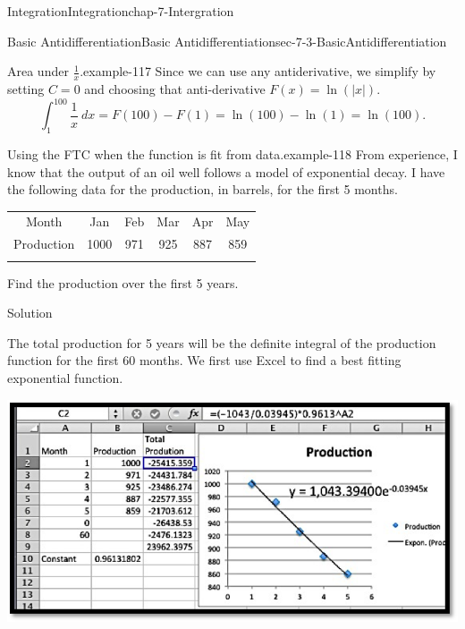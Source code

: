 \documentclass[oneside,10pt,]{book}
\numberwithin{equation}{section}
\newcommand{\hrulethin}  {\noalign{\hrule height 0.04em}}
\newcommand{\hrulemedium}{\noalign{\hrule height 0.07em}}
\newcommand{\hrulethick} {\noalign{\hrule height 0.11em}}
\begin{document}
\begin{chapterptx}{Integration}{}{Integration}{}{}{chap-7-Intergration}
\begin{sectionptx}{Basic Antidifferentiation}{}{Basic Antidifferentiation}{}{}{sec-7-3-BasicAntidifferentiation}
\begin{example}{Area under \(\frac{1}{x}\).}{example-117}
\hypertarget{p-2762}{}%
Since we can use any antiderivative, we simplify by setting \(C = 0\) and choosing that anti-derivative  \(F(x)=\ln(|x|)\).%
%
\begin{equation*}
\int_1^{100}\frac{1}{x}\ dx=F(100)-F(1)=\ln(100)-\ln(1)=\ln(100).
\end{equation*}
\end{example}
\begin{example}{Using the FTC when the function is fit from data.}{example-118}%
\hypertarget{p-2763}{}%
From experience, I know that the output of an oil well follows a model of exponential decay.  I have the following data for the production, in barrels, for the first 5 months.%
\begin{sidebyside}{1}{0}{0}{0}%
\begin{sbspanel}{1}%
{\centering%
\begin{tabular}{cccccc}\hrulethick
Month&Jan&Feb&Mar&Apr&May\tabularnewline\hrulethin
Production&1000&971&925&887&859\tabularnewline\hrulemedium
\end{tabular}
\par}
\end{sbspanel}%
\end{sidebyside}%
\par
\hypertarget{p-2764}{}%
Find the production over the first 5 years.%
\par
\hypertarget{p-2765}{}%
Solution%
\par
\hypertarget{p-2766}{}%
The total production for 5 years will be the definite integral of the production function for the first 60 months.  We first use Excel to find a best fitting exponential function.%
\begin{sidebyside}{1}{0.1}{0.1}{0}%
\begin{sbspanel}{0.8}%
\includegraphics[width=1\linewidth]{images/sec7-3-1.png}
\end{sbspanel}%
\end{sidebyside}%

\end{example}
\end{sectionptx}
\end{chapterptx}
\end{document}
